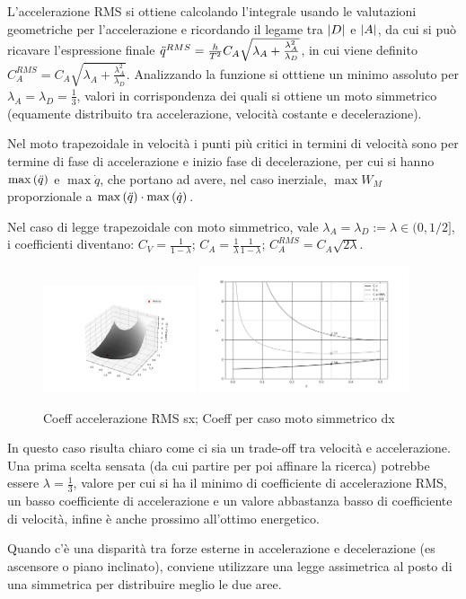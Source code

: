 L'accelerazione RMS si ottiene calcolando l'integrale usando le valutazioni geometriche per l'accelerazione e ricordando il legame tra \(\left|D\right|\) e \(\left|A\right|\), da cui si può ricavare l'espressione finale \(\Ddot{q}^{RMS} = \frac{h}{T^2} C_A \sqrt{\lambda_A + \frac{\lambda_A^2}{\lambda_D}}\), in cui viene definito \(C_A^{RMS} = C_A \sqrt{\lambda_A + \frac{\lambda_A^2}{\lambda_D}}\).
Analizzando la funzione si otttiene un minimo assoluto per \(\lambda_A=\lambda_D =\frac{1}{3}\), valori in corrispondenza dei quali si ottiene un moto simmetrico (equamente distribuito tra accelerazione, velocità costante e decelerazione).

Nel moto trapezoidale in velocità i punti più critici in termini di velocità sono per termine di fase di accelerazione e inizio fase di decelerazione, per cui si hanno \(\operatorname{max}\left(\Ddot{q}\right)\) e \(\max{\dot{q}}\), che portano ad avere, nel caso inerziale, \(\max{W_M}\) proporzionale a \(\operatorname{max}\left(\Ddot{q}\right) \cdot \operatorname{max}\left(\dot{q}\right)\).

Nel caso di legge trapezoidale con moto simmetrico, vale \(\lambda_A=\lambda_D := \lambda \in (0,1/2]\), i coefficienti diventano: \(C_V = \frac{1}{1-\lambda}\); \(C_A = \frac{1}{\lambda}\frac{1}{1-\lambda}\); \(C_A^{RMS} = C_A \sqrt{2\lambda}\).

\begin{figure}[h]
    \centering
    \includegraphics[width=0.4\textwidth]{Immagini/CaRMS.png}
    \includegraphics[width=0.55\textwidth]{Immagini/CvCaCaRMS.png}
    \caption{Coeff accelerazione RMS sx; Coeff per caso moto simmetrico dx}
\end{figure}

In questo caso risulta chiaro come ci sia un trade-off tra velocità e accelerazione.
Una prima scelta sensata (da cui partire per poi affinare la ricerca) potrebbe essere \(\lambda = \frac{1}{3}\), valore per cui si ha il minimo di coefficiente di accelerazione RMS, un basso coefficiente di accelerazione e un valore abbastanza basso di coefficiente di velocità, infine è anche prossimo all'ottimo energetico.

Quando c'è una disparità tra forze esterne in accelerazione e decelerazione (es ascensore o piano inclinato), conviene utilizzare una legge assimetrica al posto di una simmetrica per distribuire meglio le due aree.